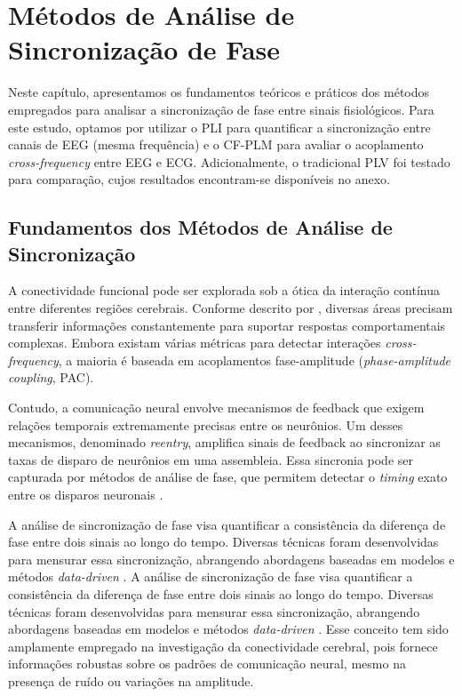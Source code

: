 \chapter{Métodos de Análise de Sincronização de Fase}
\label{chap:6_metodos_de_analise_de_sincronizacao_de_fase}
Neste capítulo, apresentamos os fundamentos teóricos e práticos dos métodos empregados para analisar a sincronização de fase entre sinais fisiológicos. Para este estudo, optamos por utilizar o PLI para quantificar a sincronização entre canais de EEG (mesma frequência) e o CF-PLM para avaliar o acoplamento \textit{cross-frequency} entre EEG e ECG. Adicionalmente, o tradicional PLV foi testado para comparação, cujos resultados encontram-se disponíveis no anexo.

\section{Fundamentos dos Métodos de Análise de Sincronização}
A conectividade funcional pode ser explorada sob a ótica da interação contínua entre diferentes regiões cerebrais. Conforme descrito por , diversas áreas precisam transferir informações constantemente para suportar respostas comportamentais complexas. Embora existam várias métricas para detectar interações \textit{cross-frequency}, a maioria é baseada em acoplamentos fase-amplitude (\textit{phase-amplitude coupling}, PAC).

Contudo, a comunicação neural envolve mecanismos de feedback que exigem relações temporais extremamente precisas entre os neurônios. Um desses mecanismos, denominado \emph{reentry}, amplifica sinais de feedback ao sincronizar as taxas de disparo de neurônios em uma assembleia. Essa sincronia pode ser capturada por métodos de análise de fase, que permitem detectar o \textit{timing} exato entre os disparos neuronais \cite{seraj2018cerebral, ren2022multi}.

A análise de sincronização de fase visa quantificar a consistência da diferença de fase entre dois sinais ao longo do tempo. Diversas técnicas foram desenvolvidas para mensurar essa sincronização, abrangendo abordagens baseadas em modelos e métodos \textit{data-driven} \cite{seraj2018cerebral}. A análise de sincronização de fase visa quantificar a consistência da diferença de fase entre dois sinais ao longo do tempo. Diversas técnicas foram desenvolvidas para mensurar essa sincronização, abrangendo abordagens baseadas em modelos e métodos \textit{data-driven} \cite{seraj2018cerebral}. Esse conceito tem sido amplamente empregado na investigação da conectividade cerebral, pois fornece informações robustas sobre os padrões de comunicação neural, mesmo na presença de ruído ou variações na amplitude.


